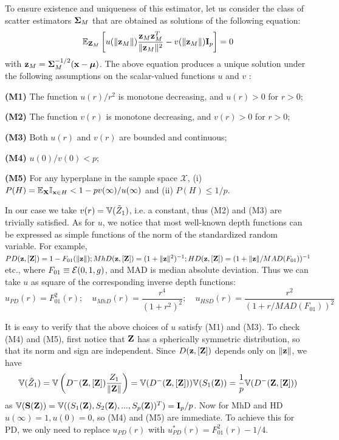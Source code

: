 To ensure existence and uniqueness of this estimator, let us consider the class of scatter estimators ${\boldsymbol{\Sigma}}_M$ that are obtained as solutions of the following equation:
%
\begin{equation}
{\mathbb{E}}_{ {\mathbf{Z}}_M } \left[ u( \| {\bf{z}}_M \| )  \frac{{\bf{z}}_M {\bf{z}}_M^T}{\| {\bf{z}}_M \|^2}  - v( \| {\bf{z}}_M \| ) {\mathbf{I}}_p \right] = 0
\end{equation}
%
with ${\bf{z}}_M = {\boldsymbol{\Sigma}}_M^{-1/2} ({\bf{x}} - {\boldsymbol{\mu}})$. The above equation produces a unique solution under the following assumptions on the scalar-valued functions $u$ and $v$ \citep{HuberBook81}:
%

\vspace{1em}
\noindent\textbf{(M1)} The function $u(r)/r^2$ is monotone decreasing, and $u(r)>0$ for $r>0$;

\noindent\textbf{(M2)}  The function $v(r)$ is monotone decreasing, and $v(r)>0$ for $r>0$;

\noindent\textbf{(M3)} Both $u(r)$ and $v(r)$ are bounded and continuous;

\noindent\textbf{(M4)} $u(0) / v(0) < p$;

\noindent\textbf{(M5)} For any hyperplane in the sample space $\mathcal X$, (i) $P(H) = {\mathbb{E}}_{\mathbf{X}} {\mathbb{I}}_{{\bf{x}} \in H} < 1 - p v(\infty) / u(\infty)$ and (ii) $P(H) \leq 1/p$.
%

\vspace{1em}
\noindent In our case we take $v(r) = {\mathbb{V}}(\tilde Z_1)$, i.e. a constant, thus (M2) and (M3) are trivially satisfied. As for $u$, we notice that most well-known depth functions can be expressed as simple functions of the norm of the standardized random variable. For example, $PD ({\bf{z}}, [{\mathbf{Z}}]) = 1 - F_{01} (\| {\bf{z}} \|); MhD( {\bf{z}}, [{\mathbf{Z}}]) = (1+\| {\bf{z}} \|^2)^{-1}; HD ({\bf{z}}, [{\mathbf{Z}}]) = (1+\| {\bf{z}} \|/ MAD(F_{01}) )^{-1}$ etc., where $F_{01} \equiv {\cal{E}}(0, 1, g)$, and MAD is median absolute deviation. Thus we can take $u$ as square of the corresponding inverse depth functions:
$$
u_{PD} (r) = F_{01}^2 (r); \quad u_{MhD}(r)  = \frac{r^4}{(1 + r^2)^2}; \quad u_{HSD}(r)  = \frac{r^2}{(1 + r/MAD(F_{01} ) )^2}
$$
%

It is easy to verify that the above choices of $u$ satisfy (M1) and (M3). To check (M4) and (M5), first notice that ${\mathbf{Z}}$ has a spherically symmetric distribution, so that its norm and sign are independent. Since $D ({\bf{z}}, [{\mathbf{Z}}])$ depends only on $\| {\bf{z}} \|$, we have
%
$$
{\mathbb{V}}(\tilde Z_1) = {\mathbb{V}} \left( D^- ({\mathbf{Z}}, [{\mathbf{Z}}]) \frac{Z_1}{ \|{\mathbf{Z}} \|} \right) = {\mathbb{V}}(D^-({\mathbf{Z}}, [{\mathbf{Z}}])) {\mathbb{V}}(S_1 ({\mathbf{Z}})) = \frac{1}{p} {\mathbb{V}}( D^- ({\mathbf{Z}}, [{\mathbf{Z}}]))
$$
%
as ${\mathbb{V}}({\mathbf{S}}({\mathbf{Z}})) = {\mathbb{V}}((S_1({\mathbf{Z}}), S_2({\mathbf{Z}}), ..., S_p({\mathbf{Z}}))^T) = {\mathbf{I}}_p/p$. Now for MhD and HD $u(\infty)=1, u(0)=0$, so (M4) and (M5) are immediate. To achieve this for PD, we only need to replace $u_{PD}(r)$ with $u_{PD}^*(r) = F_{01}^2(r) - 1/4$.

